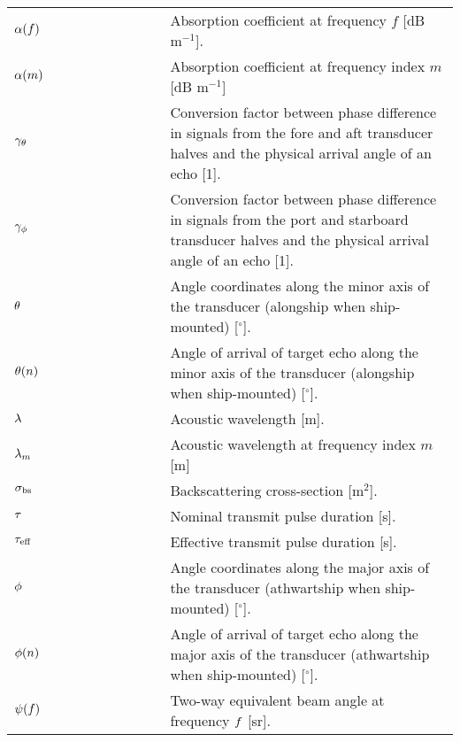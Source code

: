 \documentclass[12pt,a4paper]{article}
\begin{document}
\begin{longtable}{p{0.15\linewidth} p{0.2\linewidth} p{0.65\linewidth} }
$\alpha(f)$  & & Absorption coefficient at frequency $f$ [dB $\textrm{m}^{-1}$].\\
$\alpha(m)$ & & Absorption coefficient at frequency index $m$ [dB $\textrm{m}^{-1}$]\\
$\gamma_\theta$ & & Conversion factor between phase difference in signals from the fore and aft transducer halves and the physical arrival angle of an echo [1].\\
$\gamma_\phi$ & & Conversion factor between phase difference in signals from the port and starboard transducer halves and the physical arrival angle of an echo [1].\\
$\theta$ & & Angle coordinates along the minor axis of the transducer (alongship when ship-mounted) [$^\circ$].\\
$\theta(n)$ & & Angle of arrival of target echo along the minor axis of the transducer (alongship when ship-mounted) [$^\circ$].\\
$\lambda$ & &  Acoustic wavelength [m].\\
$\lambda_m$ & & Acoustic wavelength at frequency index $m$ [m]\\
$\sigma_{\textrm{bs}}$ & & Backscattering cross-section [$\textrm{m}^2$].\\
$\tau$ & & Nominal transmit pulse duration [s].\\
$\tau_{\textrm{eff}}$ & & Effective transmit pulse duration [s].\\
$\phi$ & & Angle coordinates along the major axis of the transducer (athwartship when ship-mounted) [$^\circ$].\\
$\phi(n)$ & & Angle of arrival of target echo along the major axis of the transducer (athwartship when ship-mounted) [$^\circ$].\\
$\psi(f)$ & & Two-way equivalent beam angle at frequency $f$ [sr].\\
\end{longtable}
\end{document}
